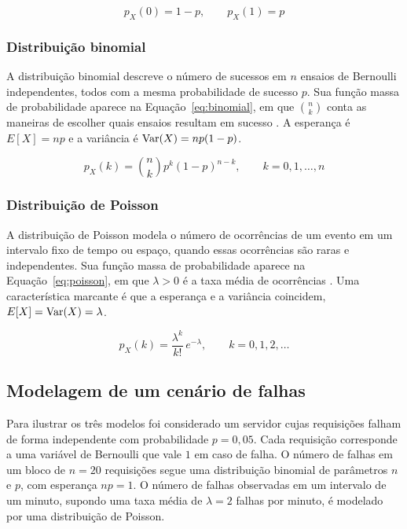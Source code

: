 \begin{equation}
	p_X(0) = 1 - p, \qquad p_X(1) = p
	\label{eq:bernoulli}
\end{equation}

\subsubsection{Distribuição binomial}

A distribuição binomial descreve o número de sucessos em $n$ ensaios de Bernoulli
independentes, todos com a mesma probabilidade de sucesso $p$. Sua função massa de
probabilidade aparece na Equação~\ref{eq:binomial}, em que $\binom{n}{k}$ conta as
maneiras de escolher quais ensaios resultam em sucesso \cite{chan2021probability}. A
esperança é $E[X] = np$ e a variância é $\operatorname{Var}(X) = np(1-p)$.

\begin{equation}
	p_X(k) = \binom{n}{k} p^k (1 - p)^{n-k}, \qquad k = 0, 1, \ldots, n
	\label{eq:binomial}
\end{equation}

\subsubsection{Distribuição de Poisson}

A distribuição de Poisson modela o número de ocorrências de um evento em um
intervalo fixo de tempo ou espaço, quando essas ocorrências são raras e
independentes. Sua função massa de probabilidade aparece na
Equação~\ref{eq:poisson}, em que $\lambda > 0$ é a taxa média de ocorrências
\cite{chan2021probability}. Uma característica marcante é que a esperança e a
variância coincidem, $E[X] = \operatorname{Var}(X) = \lambda$.

\begin{equation}
	p_X(k) = \frac{\lambda^k}{k!}\, e^{-\lambda}, \qquad k = 0, 1, 2, \ldots
	\label{eq:poisson}
\end{equation}

\subsection{Modelagem de um cenário de falhas}

Para ilustrar os três modelos foi considerado um servidor cujas requisições falham
de forma independente com probabilidade $p = 0{,}05$. Cada requisição corresponde a
uma variável de Bernoulli que vale $1$ em caso de falha. O número de falhas em um
bloco de $n = 20$ requisições segue uma distribuição binomial de parâmetros $n$ e
$p$, com esperança $np = 1$. O número de falhas observadas em um intervalo de um
minuto, supondo uma taxa média de $\lambda = 2$ falhas por minuto, é modelado por
uma distribuição de Poisson.

